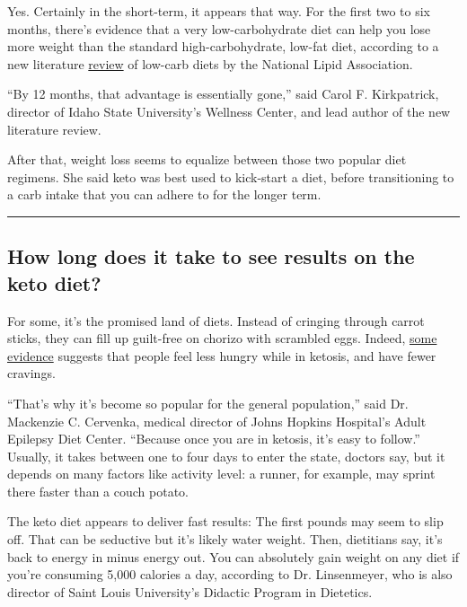 Yes. Certainly in the short-term, it appears that way. For the first two
to six months, there's evidence that a very low-carbohydrate diet can
help you lose more weight than the standard high-carbohydrate, low-fat
diet, according to a new literature
\href{https://www.lipidjournal.com/article/S1933-2874(19)30267-3/pdf}{review}
of low-carb diets by the National Lipid Association.

``By 12 months, that advantage is essentially gone,'' said Carol F.
Kirkpatrick, director of Idaho State University's Wellness Center, and
lead author of the new literature review.

After that, weight loss seems to equalize between those two popular diet
regimens. She said keto was best used to kick-start a diet, before
transitioning to a carb intake that you can adhere to for the longer
term.

\begin{center}\rule{0.5\linewidth}{\linethickness}\end{center}

\hypertarget{how-long-does-it-take-to-see-results-on-the-keto-diet}{%
\subsection{How long does it take to see results on the keto
diet?}\label{how-long-does-it-take-to-see-results-on-the-keto-diet}}

For some, it's the promised land of diets. Instead of cringing through
carrot sticks, they can fill up guilt-free on chorizo with scrambled
eggs. Indeed,
\href{https://onlinelibrary.wiley.com/doi/full/10.1111/obr.12230}{some
evidence} suggests that people feel less hungry while in ketosis, and
have fewer cravings.

``That's why it's become so popular for the general population,'' said
Dr. Mackenzie C. Cervenka, medical director of Johns Hopkins Hospital's
Adult Epilepsy Diet Center. ``Because once you are in ketosis, it's easy
to follow.'' Usually, it takes between one to four days to enter the
state, doctors say, but it depends on many factors like activity level:
a runner, for example, may sprint there faster than a couch potato.

The keto diet appears to deliver fast results: The first pounds may seem
to slip off. That can be seductive but it's likely water weight. Then,
dietitians say, it's back to energy in minus energy out. You can
absolutely gain weight on any diet if you're consuming 5,000 calories a
day, according to Dr. Linsenmeyer, who is also director of Saint Louis
University's Didactic Program in Dietetics.

